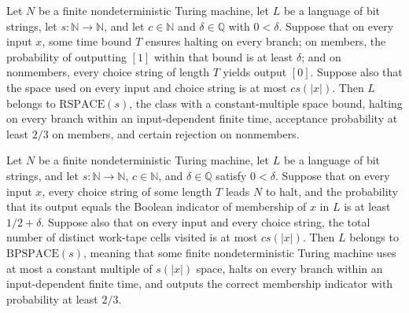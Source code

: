 \begin{theorem}
\label{Randomized.mem_RSPACE_of_pos}
\leanok
{}
Let $N$ be a finite nondeterministic Turing machine, let $L$ be a language of bit
strings, let $s:\mathbb{N}\to\mathbb{N}$, and let $c\in\mathbb{N}$ and
$\delta\in\mathbb{Q}$ with $0<\delta$. Suppose that on every input $x$, some time bound
$T$ ensures halting on every branch; on members, the probability of outputting $[1]$
within that bound is at least $\delta$; and on nonmembers, every choice string of length
$T$ yields output $[0]$. Suppose also that the space used on every input and choice
string is at most $c s(|x|)$. Then $L$ belongs to $\mathrm{RSPACE}(s)$, the class with a
constant-multiple space bound, halting on every branch within an input-dependent finite
time, acceptance probability at least $2/3$ on members, and certain rejection on
nonmembers.
\end{theorem}

\begin{theorem}
\label{Randomized.mem_BPSPACE_of_advantage}
\leanok
{}
Let $N$ be a finite nondeterministic Turing machine, let $L$ be a language of bit
strings, and let $s:\mathbb{N}\to\mathbb{N}$, $c\in\mathbb{N}$, and
$\delta\in\mathbb{Q}$ satisfy $0<\delta$. Suppose that on every input $x$, every choice
string of some length $T$ leads $N$ to halt, and the probability that its output equals
the Boolean indicator of membership of $x$ in $L$ is at least $1/2+\delta$. Suppose also
that on every input and every choice string, the total number of distinct work-tape
cells visited is at most $c s(|x|)$. Then $L$ belongs to $\mathrm{BPSPACE}(s)$, meaning
that some finite nondeterministic Turing machine uses at most a constant multiple of
$s(|x|)$ space, halts on every branch within an input-dependent finite time, and outputs
the correct membership indicator with probability at least $2/3$.
\end{theorem}
